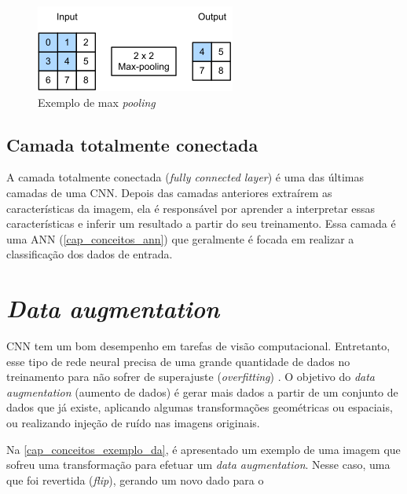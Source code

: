 \begin{figure}[htb]
	\caption {\label{exemplo_pooling} Exemplo de max \textit{pooling}}
	\begin{center}
		\includegraphics[scale=1.0]{Imagens/maxpooling}
	\end{center}
\end{figure}

\subsection{Camada totalmente conectada}\label{cap_conceitos_cnn_totalmente}
A camada totalmente conectada (\textit{fully connected layer}) é uma das últimas camadas de uma CNN.
Depois das camadas anteriores extraírem as características da imagem, ela é responsável por
aprender a interpretar essas características e inferir um resultado a partir do seu treinamento.
Essa camada é uma ANN (\autoref{cap_conceitos_ann}) que geralmente é focada em realizar a classificação dos dados
de entrada.

\section{\textit{Data augmentation}}\label{cap_conceitos_data_augmentation}
CNN tem um bom desempenho em tarefas de visão computacional. Entretanto, esse tipo de rede neural precisa de uma
grande quantidade de dados no treinamento para não sofrer de superajuste (\textit{overfitting})
\cite{shorten2019survey}.
O objetivo do \textit{data augmentation} (aumento de dados) é gerar mais dados a partir de um conjunto de dados
que já existe, aplicando algumas transformações geométricas ou espaciais, ou realizando injeção de ruído nas imagens
originais.

Na \autoref{cap_conceitos_exemplo_da}, é apresentado um exemplo de uma imagem que sofreu uma transformação para efetuar
um \textit{data augmentation}.
Nesse caso, uma que foi revertida (\textit{flip}), gerando um novo dado para o 

